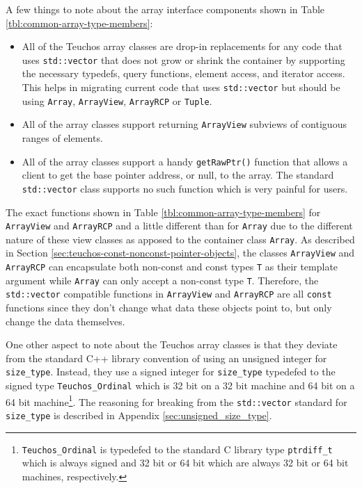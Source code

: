 \documentclass[pdf,ps2pdf,11pt]{SANDreport}
\begin{document}
A few things to note about the array interface components shown in
Table {}\ref{tbl:common-array-type-members}:

\begin{itemize}

{}\item{}All of the Teuchos array classes are drop-in replacements for
any code that uses {}\texttt{std::vector} that does not grow or shrink
the container by supporting the necessary typedefs, query functions,
element access, and iterator access.  This helps in migrating current
code that uses {}\texttt{std::vector} but should be using
{}\texttt{Array}, {}\texttt{ArrayView}, {}\texttt{ArrayRCP} or
{}\texttt{Tuple}.

{}\item{}All of the array classes support returning \texttt{ArrayView}
subviews of contiguous ranges of elements.

{}\item{}All of the array classes support a handy
{}\texttt{getRawPtr()} function that allows a client to get the base
pointer address, or null, to the array.  The standard
{}\texttt{std::vector} class supports no such function which is very
painful for users.

\end{itemize}

The exact functions shown in Table
{}\ref{tbl:common-array-type-members} for {}\texttt{ArrayView} and
{}\texttt{ArrayRCP} and a little different than for {}\texttt{Array}
due to the different nature of these view classes as apposed to the
container class {}\texttt{Array}.  As described in Section
{}\ref{sec:teuchos-const-nonconst-pointer-objects}, the classes
{}\texttt{ArrayView} and {}\texttt{ArrayRCP} can encapsulate both
non-const and const types {}\texttt{T} as their template argument
while {}\texttt{Array} can only accept a non-const type {}\texttt{T}.
Therefore, the {}\texttt{std::vector} compatible functions in
{}\texttt{ArrayView} and {}\texttt{ArrayRCP} are all {}\texttt{const}
functions since they don't change what data these objects point to,
but only change the data themselves.

One other aspect to note about the Teuchos array classes is that they
deviate from the standard C++ library convention of using an unsigned
integer for {}\texttt{size\_type}.  Instead, they use a signed integer
for {}\texttt{size\_type} typedefed to the signed type
{}\texttt{Teuchos\_Ordinal} which is 32 bit on a 32 bit machine and 64
bit on a 64 bit machine\footnote{{}\texttt{Teuchos\_Ordinal} is
typedefed to the standard C library type {}\texttt{ptrdiff\_t} which
is always signed and 32 bit or 64 bit which are always 32 bit or 64
bit machines, respectively.}.  The reasoning for breaking from the
{}\texttt{std::vector} standard for {}\texttt{size\_type} is described
in Appendix {}\ref{sec:unsigned_size_type}.
\end{document}

